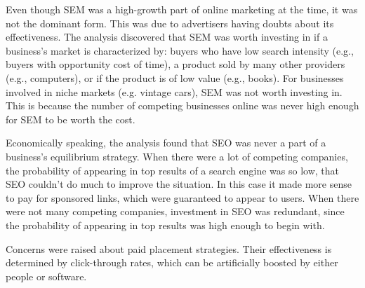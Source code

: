 \documentclass[../summaries.tex]{subfiles}
\begin{document}
Even though SEM was a high-growth part of online marketing at the time, it was not the dominant form. This was due to advertisers having doubts about its effectiveness. The analysis discovered that SEM was worth investing in if a business's market is characterized by: buyers who have low search intensity (e.g., buyers with opportunity cost of time), a product sold by many other providers (e.g., computers), or if the product is of low value (e.g., books). For businesses involved in niche markets (e.g. vintage cars), SEM was not worth investing in. This is because the number of competing businesses online was never high enough for SEM to be worth the cost.

Economically speaking, the analysis found that SEO was never a part of a business's equilibrium strategy. When there were a lot of competing companies, the probability of appearing in top results of a search engine was so low, that SEO couldn't do much to improve the situation. In this case it made more sense to pay for sponsored links, which were guaranteed to appear to users. When there were not many competing companies, investment in SEO was redundant, since the probability of appearing in top results was high enough to begin with.

Concerns were raised about paid placement strategies. Their effectiveness is determined by click-through rates, which can be artificially boosted by either people or software.
	
\end{document}
